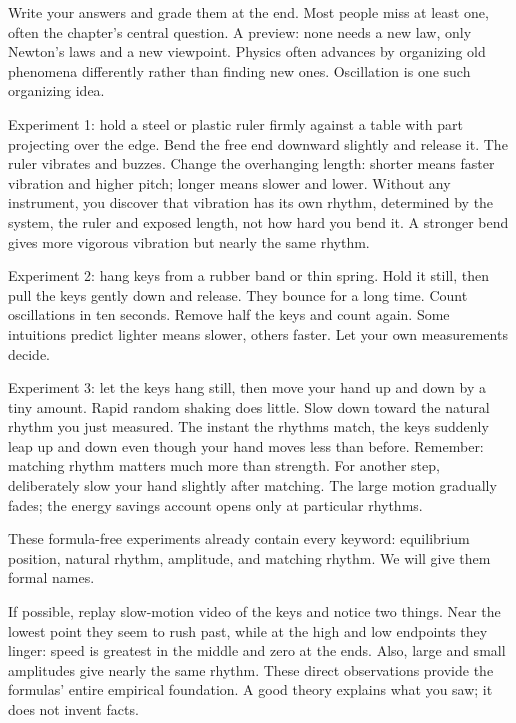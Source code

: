 Write your answers and grade them at the end. Most people miss at least one, often the chapter's central question. A preview: none needs a new law, only Newton's laws and a new viewpoint. Physics often advances by organizing old phenomena differently rather than finding new ones. Oscillation is one such organizing idea.


\begin{experiment}
Experiment 1: hold a steel or plastic ruler firmly against a table with part projecting over the edge. Bend the free end downward slightly and release it. The ruler vibrates and buzzes. Change the overhanging length: shorter means faster vibration and higher pitch; longer means slower and lower. Without any instrument, you discover that vibration has its own rhythm, determined by the system, the ruler and exposed length, not how hard you bend it. A stronger bend gives more vigorous vibration but nearly the same rhythm.

Experiment 2: hang keys from a rubber band or thin spring. Hold it still, then pull the keys gently down and release. They bounce for a long time. Count oscillations in ten seconds. Remove half the keys and count again. Some intuitions predict lighter means slower, others faster. Let your own measurements decide.

Experiment 3: let the keys hang still, then move your hand up and down by a tiny amount. Rapid random shaking does little. Slow down toward the natural rhythm you just measured. The instant the rhythms match, the keys suddenly leap up and down even though your hand moves less than before. Remember: matching rhythm matters much more than strength. For another step, deliberately slow your hand slightly after matching. The large motion gradually fades; the energy savings account opens only at particular rhythms.
\end{experiment}

These formula-free experiments already contain every keyword: equilibrium position, natural rhythm, amplitude, and matching rhythm. We will give them formal names.

If possible, replay slow-motion video of the keys and notice two things. Near the lowest point they seem to rush past, while at the high and low endpoints they linger: speed is greatest in the middle and zero at the ends. Also, large and small amplitudes give nearly the same rhythm. These direct observations provide the formulas' entire empirical foundation. A good theory explains what you saw; it does not invent facts.

